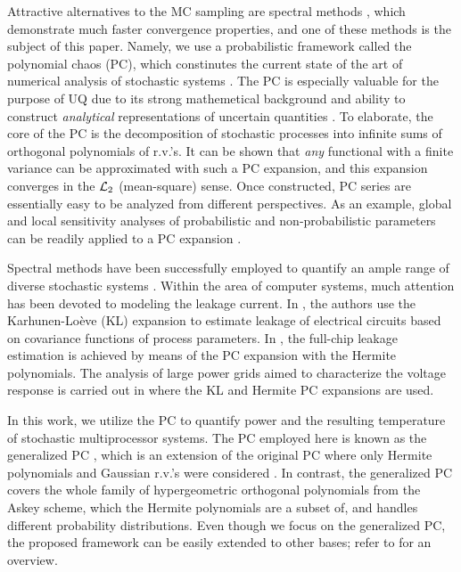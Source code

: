 Attractive alternatives to the MC sampling are spectral methods \cite{maitre2010}, which demonstrate much faster convergence properties, and one of these methods is the subject of this paper. Namely, we use a probabilistic framework called the polynomial chaos (PC), which constinutes the current state of the art of numerical analysis of stochastic systems \cite{xiu2009}. The PC is especially valuable for the purpose of UQ due to its strong mathemetical background and ability to construct \emph{analytical} representations of uncertain quantities \cite{eldred2009}. To elaborate, the core of the PC is the decomposition of stochastic processes into infinite sums of orthogonal polynomials of r.v.'s. It can be shown that \emph{any} functional with a finite variance can be approximated with such a PC expansion, and this expansion converges in the $\mathcal{L}_{2}$ (mean-square) sense. Once constructed, PC series are essentially easy to be analyzed from different perspectives. As an example, global and local sensitivity analyses of probabilistic and non-probabilistic parameters can be readily applied to a PC expansion \cite{eldred2009, maitre2010}.

Spectral methods have been successfully employed to quantify an ample range of diverse stochastic systems \cite{xiu2010}. Within the area of computer systems, much attention has been devoted to modeling the leakage current. In \cite{bhardwaj2006}, the authors use the Karhunen-Lo\`{e}ve (KL) expansion \cite{loeve1978} to estimate leakage of electrical circuits based on covariance functions of process parameters. In \cite{shen2009}, the full-chip leakage estimation is achieved by means of the PC expansion with the Hermite polynomials. The analysis of large power grids aimed to characterize the voltage response is carried out in \cite{ghanta2006} where the KL and Hermite PC expansions are used.

In this work, we utilize the PC to quantify power and the resulting temperature of stochastic multiprocessor systems. The PC employed here is known as the generalized PC \cite{xiu2002}, which is an extension of the original PC where only Hermite polynomials and Gaussian r.v.'s were considered \cite{ghanem1991}. In contrast, the generalized PC covers the whole family of hypergeometric orthogonal polynomials from the Askey scheme, which the Hermite polynomials are a subset of, and handles different probability distributions. Even though we focus on the generalized PC, the proposed framework can be easily extended to other bases; refer to \cite{maitre2010} for an overview.

